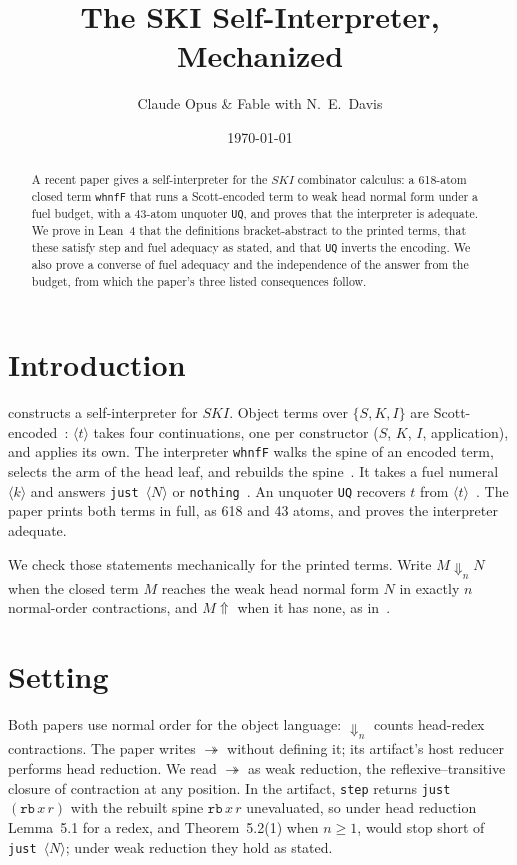 \documentclass[11pt]{amsart}
\title{The $\bm{SKI}$ Self-Interpreter, Mechanized}
\author{Claude Opus \& Fable with N.\ E.\ Davis}
\date{\today}
\newcommand{\tw}[1]{\texttt{#1}}
\newcommand{\enc}[1]{\langle #1\rangle}
\newcommand{\red}{\twoheadrightarrow}
\begin{document}
\begin{abstract}
A recent paper gives a self-interpreter for the $SKI$ combinator calculus: a 618-atom closed term
\tw{whnfF} that runs a Scott-encoded term to weak head normal form under a fuel budget, with a
43-atom unquoter \tw{UQ}, and proves that the interpreter is adequate. We prove in Lean~4 that the
definitions bracket-abstract to the printed terms, that these satisfy step and fuel adequacy as
stated, and that \tw{UQ} inverts the encoding. We also prove a converse of fuel adequacy and the independence of the answer
from the budget, from which the paper's three listed consequences follow.
\end{abstract}

\maketitle

\section{Introduction}

\citet{davis-si} constructs a self-interpreter for $SKI$. Object terms over $\{S,K,I\}$ are
Scott-encoded~\citep[\S3.1]{davis-si}: $\enc t$ takes four continuations, one per constructor ($S$,
$K$, $I$, application), and applies its own. The interpreter \tw{whnfF} walks the spine of an encoded
term, selects the arm of the head leaf, and rebuilds the spine~\citep[\S3.1]{davis-si}. It takes a
fuel numeral $\enc k$ and answers \tw{just}~$\enc N$ or \tw{nothing}~\citep[Thm.~5.2]{davis-si}. An
unquoter \tw{UQ} recovers $t$ from $\enc t$~\citep[\S3.1]{davis-si}. The paper prints both terms in
full, as 618 and 43 atoms, and proves the interpreter adequate.

We check those statements mechanically for the printed terms. Write $M\Downarrow_n N$ when the
closed term $M$ reaches the weak head normal form $N$ in exactly $n$ normal-order contractions, and
$M\Uparrow$ when it has none, as in~\citep[\S5.1]{davis-si}.

\section{Setting}

Both papers use normal order for the object language: $\Downarrow_n$ counts head-redex
contractions. The paper writes $\red$ without defining it; its artifact's host reducer performs
head reduction. We read $\red$ as weak reduction, the reflexive--transitive closure of contraction at
any position. In the artifact, \tw{step} returns \tw{just}~$(\tw{rb}\,x\,r)$ with the rebuilt spine
$\tw{rb}\,x\,r$ unevaluated, so under head reduction Lemma~5.1 for a redex, and Theorem~5.2(1) when
$n\ge1$, would stop short of \tw{just}~$\enc{N}$; under weak reduction they hold as stated.
\end{document}
